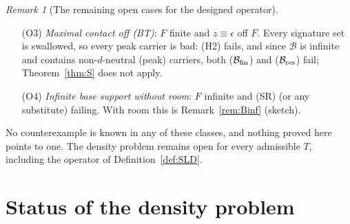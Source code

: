 \documentclass[10pt]{amsart}
\theoremstyle{definition}
\theoremstyle{remark}
\newtheorem{remark}[theorem]{Remark}
\newcommand{\dist}{\operatorname{dist}}
\newcommand{\Cset}{\mathcal C}
\newcommand{\Rec}{\mathcal R}
\newcommand{\zh}{\hat z}
\begin{document}
\begin{remark}[The remaining open cases for the designed operator]
\begin{enumerate}
admissible forced data (Remark~\ref{rem:lemmaZ}(c)).  (For $F$ infinite
some $S_l$ with $l>L$ may meet $F$, and $a$ must be truncated as well,
since otherwise $f^L$ has infinite base support and none of the proved
classes applies to it; a reduction along these lines must then cover
every $f$, including $F$ infinite, cf.\ (O4).)  Again since the $S_l$ are
disjoint, $z^L\to z$ coordinatewise and $f^L\to f$; every $S_l$ with $l>L$
has full room at $f^L$; and for $l\le L$ the room of $S_l$ and the values
$u_l(\zh^L)=u_l(\zh)$ are unchanged (allowedness (a)).  At $f$ the fine
carriers are only box-bounded, $\sum_{l>L}|\Delta\theta_l|\le6c_{L+1}/t$
(Lemma~\ref{lem:box} and (P2)).  Open: is $\dist(\rho g,\Cset(f^L))\to0$
(or along some other sequence of finitely swallowed approximants)?  And
are all finitely swallowed first rows in $\Rec$?  The latter is proved
under the hypotheses of Theorem~\ref{thm:S}, sketched in
Remark~\ref{rem:thmM}, and open in case (O1).
\item[(O3)] \emph{Maximal contact off \textup{(BT)}}: $F$ finite and
$z\equiv\epsilon$ off $F$.  Every signature set is swallowed, so every
peak carrier is bad: \textup{(H2)} fails, and since $\mathcal B$ is
infinite and contains non-$d$-neutral (peak) carriers, both
\textup{($\mathcal B_{\rm fin}$)} and \textup{($\mathcal B_{\rm res}$)}
fail; Theorem~\ref{thm:S} does not apply.
\item[(O4)] \emph{Infinite base support without room}: $F$ infinite and
\textup{(SR)} (or any substitute) failing.  With room this is
Remark~\ref{rem:Binf} (sketch).
\end{enumerate}
No counterexample is known in any of these classes, and nothing proved here
points to one.  The density problem remains open for every admissible $T$,
including the operator of Definition~\ref{def:SLD}.
\end{remark}

\section{Status of the density problem}\label{sec:status}
\end{document}
